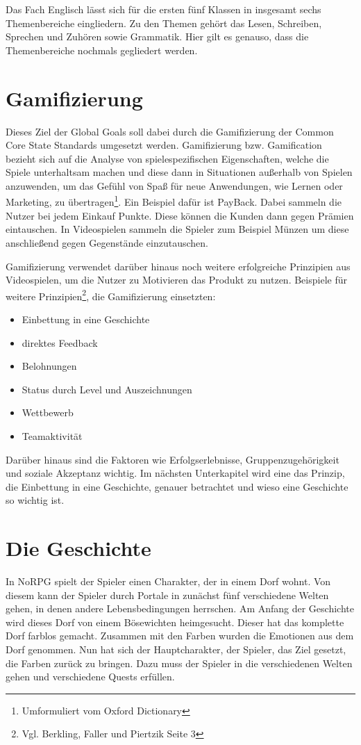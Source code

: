 Das Fach Englisch lässt sich für die ersten fünf Klassen in insgesamt sechs Themenbereiche eingliedern. Zu den Themen gehört das Lesen, Schreiben, Sprechen und Zuhören sowie Grammatik. Hier gilt es genauso, dass die Themenbereiche nochmals gegliedert werden.

\section{Gamifizierung}
Dieses Ziel der Global Goals soll dabei durch die Gamifizierung der Common Core State Standards umgesetzt werden. Gamifizierung bzw. Gamification bezieht sich auf die Analyse von spielespezifischen Eigenschaften, welche die Spiele unterhaltsam machen und diese dann in Situationen außerhalb von Spielen anzuwenden, um das Gefühl von Spaß für neue Anwendungen, wie Lernen oder Marketing, zu übertragen\footnote{Umformuliert vom Oxford Dictionary}. Ein Beispiel dafür ist PayBack. Dabei sammeln die Nutzer bei jedem Einkauf Punkte. Diese können die Kunden dann gegen Prämien eintauschen. In Videospielen sammeln die Spieler zum Beispiel Münzen um diese anschließend gegen Gegenstände einzutauschen. 

Gamifizierung verwendet darüber hinaus noch weitere erfolgreiche Prinzipien aus Videospielen, um die Nutzer zu Motivieren das Produkt zu nutzen. Beispiele für weitere Prinzipien\footnote{Vgl. Berkling, Faller und Piertzik \cite{gamesPaper} Seite 3}, die Gamifizierung einsetzten:

\begin{itemize}
\item Einbettung in eine Geschichte
\item direktes Feedback
\item Belohnungen
\item Status durch Level und Auszeichnungen
\item Wettbewerb
\item Teamaktivität
\end{itemize}

Darüber hinaus sind die Faktoren wie Erfolgserlebnisse, Gruppenzugehörigkeit und soziale Akzeptanz wichtig. Im nächsten Unterkapitel wird eine das Prinzip, die Einbettung in eine Geschichte, genauer betrachtet und wieso eine Geschichte so wichtig ist.
	
\section{Die Geschichte}
In NoRPG spielt der Spieler einen Charakter, der in einem Dorf wohnt. Von diesem kann der Spieler durch Portale in zunächst fünf verschiedene Welten gehen, in denen andere Lebensbedingungen herrschen. Am Anfang der Geschichte wird dieses Dorf von einem Bösewichten heimgesucht. Dieser hat das komplette Dorf farblos gemacht. Zusammen mit den Farben wurden die Emotionen aus dem Dorf genommen. Nun hat sich der Hauptcharakter, der Spieler, das Ziel gesetzt, die Farben zurück zu bringen. Dazu muss der Spieler in die verschiedenen Welten gehen und verschiedene Quests erfüllen.


